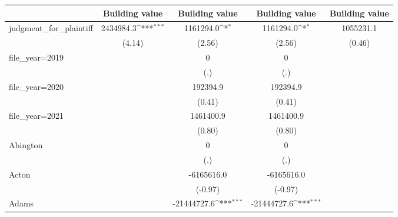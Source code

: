 {
\def\sym#1{\ifmmode^{#1}\else\(^{#1}\)\fi}
\begin{tabular}{l*{4}{c}}
\toprule
                    &\multicolumn{1}{c}{\hspace{0.25cm}Building value}&\multicolumn{1}{c}{\hspace{0.25cm}Building value}&\multicolumn{1}{c}{\hspace{0.25cm}Building value}&\multicolumn{1}{c}{\hspace{0.25cm}Building value}\\
\midrule
judgment\_for\_plaintiff&   2434984.3\sym{***}&   1161294.0\sym{*}  &   1161294.0\sym{*}  &   1055231.1         \\
                    &      (4.14)         &      (2.56)         &      (2.56)         &      (0.46)         \\
\addlinespace
file\_year=2019      &                     &           0         &           0         &                     \\
                    &                     &         (.)         &         (.)         &                     \\
\addlinespace
file\_year=2020      &                     &    192394.9         &    192394.9         &                     \\
                    &                     &      (0.41)         &      (0.41)         &                     \\
\addlinespace
file\_year=2021      &                     &   1461400.9         &   1461400.9         &                     \\
                    &                     &      (0.80)         &      (0.80)         &                     \\
\addlinespace
Abington            &                     &           0         &           0         &                     \\
                    &                     &         (.)         &         (.)         &                     \\
\addlinespace
Acton               &                     &  -6165616.0         &  -6165616.0         &                     \\
                    &                     &     (-0.97)         &     (-0.97)         &                     \\
\addlinespace
Adams               &                     & -21444727.6\sym{***}& -21444727.6\sym{***}&                     \\

\end{tabular}}
